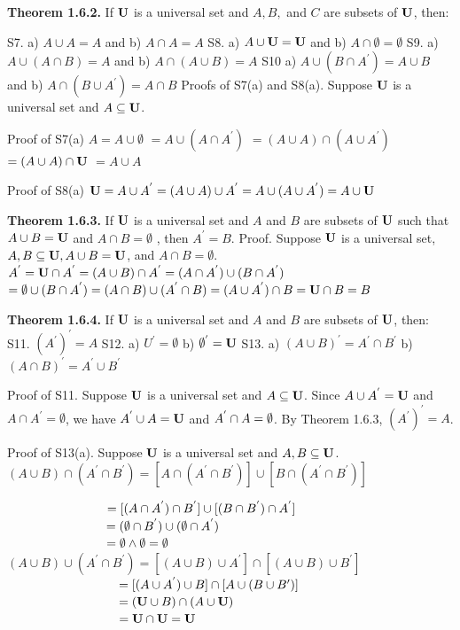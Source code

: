 \begin{large}
\textbf{Theorem 1.6.2.} If $\textbf{U}$ is a universal set and $A, B,$ and $C$ are subsets of $\textbf{U}$, then: \nl

S7. a) $A \cup A=A$ and b) $A \cap A =A $\nl
S8. a) $A \cup \textbf{U} = \textbf{U}$ and b) $A \cap \emptyset = \emptyset$\nl
S9. a) $A \cup (A \cap B) = A$ and b) $A \cap (A \cup B)=A$ \nl
S10 a) $A \cup (B \cap A^{'})= A\cup B$ and b) $A \cap (B \cup A^{'}) =A \cap B$ \nl
Proofs of S7(a) and S8(a). Suppose $\textbf{U}$ is a universal set and $A \subseteq \textbf{U}$.

Proof of S7(a)\nl
$A = A \cup \emptyset$\nl
$ = A\cup (A\cap A^{'})$  \nl
$ = (A\cup A) \cap (A \cup A^{'})$ \nl
$ = (A \cup A) \cap \textbf{U} $ \nl
$ = A \cup A$\nl

 Proof of S8(a)\nl
 $\textbf{U} = A \cup A^{'}  = (A \cup A) \cup A^{'}  = A \cup (A \cup A^{'}) =A \cup \textbf{U} $\nl

\textbf{Theorem 1.6.3.} If $\textbf{U}$ is a universal set and $A$ and $B$ are subsets of $\textbf{U}$ such that $A \cup  B = \textbf{U}$ and $A \cap B = \emptyset$ , then $A^{'} = B$. \nl
Proof. Suppose $\textbf{U}$ is a universal set, $A,B \subseteq \textbf{U}, A \cup B= \textbf{U}$, and $A \cap B = \emptyset $. $A^{'} = \textbf{U} \cap A^{'} = (A\cup B)\cap A^{'} =(A\cap A^{'}) \cup (B\cap A^{'})$
$=\emptyset \cup(B \cap A^{'}) =(A \cap B) \cup(A^{'} \cap B) = (A\cup A^{'})\cap B = \textbf{U} \cap B = B $\nl

\textbf{Theorem 1.6.4.} If $\textbf{U}$ is a universal set and $A$ and $B$ are subsets of $\textbf{U}$, then:\nl
 S11. $(A^{'})^{'} = A $\nl
 S12. a) $U^{'}= \emptyset$ \qqu b) $\emptyset ^{'} = \textbf{U} $ \nl
 S13. a) $(A \cup B)^{'} = A^{'}\cap B^{'}$  \qqu b) $(A\cap B)^{'} = A^{'} \cup B^{'}$ \nl

 Proof of S11. Suppose $\textbf{U}$ is a universal set and $A \subseteq \textbf{U}$. Since $A \cup A^{'} = \textbf{U}$ and $A \cap A^{'} = \emptyset $, we have $A^{'} \cup A = \textbf{U}$ and $A^{'} \cap A= \emptyset$. By Theorem 1.6.3, $(A^{'})^{'} = A$. \nl

 Proof of S13(a). Suppose $\textbf{U}$ is a universal set and $A,B \subseteq  \textbf{U}$. $(A\cup B) \cap (A^{'} \cap B^{'}) =[A\cap (A^{'} \cap B^{'})] \cup [B \cap  (A^{'} \cap B^{'})] $

\newpage
$\qquad \qquad \qquad \qquad = [(A \cap A^{'}) \cap B^{'}] \cup [(B \cap B^{'}) \cap A^{'}]$ \\
$\qquad \qquad \qquad \qquad =(\emptyset \cap B^{'}) \cup (\emptyset \cap A^{'})$\\
$\qquad \qquad \qquad \qquad = \emptyset \wedge \emptyset = \emptyset$ \\

$(A \cup B) \cup (A^{'}\cap B^{'}) = [(A \cup B) \cup A^{'}] \cap [(A \cup B) \cup B^{'}]$\\
$\qquad \qquad \qquad \qquad \quad = [(A \cup A^{'}) \cup B] \cap  [A \cup (B\cup B{'})]$\\
$\qquad \qquad \qquad \qquad \quad =(\textbf{U} \cup B)\cap (A \cup \textbf{U})$ \\
$\qquad \qquad \qquad \qquad \quad =\textbf{U} \cap \textbf{U} = \textbf{U}$ \\


\end{large}
